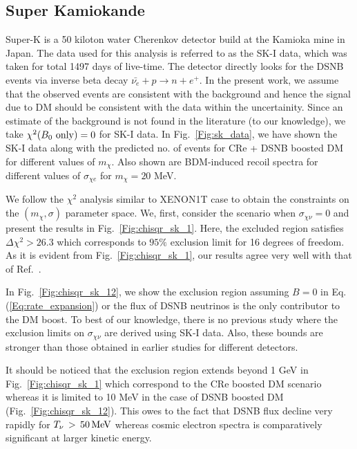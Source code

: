 \documentclass[11pt,prd,twocolumn,nofootinbib,reprint,superscriptaddress,longbibliography,colorlinks=true,citecolor=blue]{revtex4-1}
\begin{document}
\subsection*{Super Kamiokande}
Super-K is a 50 kiloton water Cherenkov detector build at the Kamioka mine in Japan. The data used for this analysis is referred to as the SK-I data, which was taken for total 1497 days of live-time. The detector directly looks for the DSNB events via inverse beta decay $\bar{\nu_e} + p \to n + e^+ $. In the present work, we assume that the observed events are consistent with the background and hence the signal due to DM should be consistent with the data within the uncertainity. Since an estimate of the background is not found in the literature (to our knowledge), we take $\chi^2(B_0~\rm{only}) = 0$ for SK-I data. In Fig.~\ref{Fig:sk_data}, we have shown the SK-I data  along with the predicted no. of events for CRe + DSNB boosted DM for different values of $m_\chi$. Also shown are BDM-induced recoil spectra for different values of $\sigma_{\chi e}$ for $m_\chi=20$ MeV.  

We follow the $\chi^2$ analysis similar to XENON1T case to obtain the constraints on the $(m_\chi , \sigma)$ parameter space. We, first, consider the scenario when $\sigma_{\chi \nu} = 0$ and present the results in Fig.~\ref{Fig:chisqr_sk_1}. Here, the excluded region satisfies $\Delta \chi^2 > 26.3$ which corresponds to $95\%$ exclusion limit for 16 degrees of freedom. As it is evident from Fig.~\ref{Fig:chisqr_sk_1}, our  results agree very well with that of Ref.~\cite{Cappiello:2019qsw}. 

In Fig.~\ref{Fig:chisqr_sk_12}, we show the exclusion region assuming $B = 0$ in Eq.(\ref{Eq:rate_expansion}) or the flux of DSNB neutrinos is the only contributor to the DM boost. To best of our knowledge, there is no previous study where the exclusion limits on $\sigma_{\chi \nu}$ are derived using SK-I data. Also, these bounds are stronger than those obtained in earlier studies for different detectors. 

It should be noticed that the exclusion region extends beyond 1 GeV in Fig.~\ref{Fig:chisqr_sk_1} which correspond to the CRe boosted DM scenario whereas it is limited to 10 MeV in the  case of DSNB boosted DM (Fig.~\ref{Fig:chisqr_sk_12}). This owes to the fact that DSNB flux decline very rapidly for $T_\nu\,>\,50\,{\rm MeV}$ whereas cosmic electron spectra is comparatively significant at larger kinetic energy. 
\end{document}
